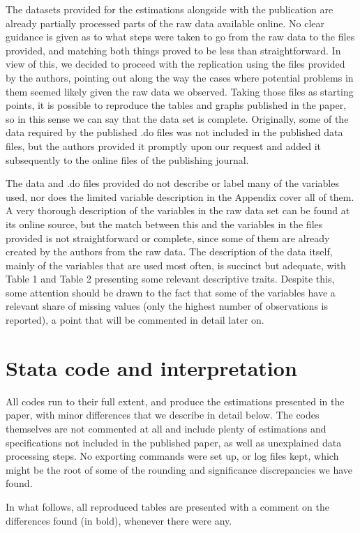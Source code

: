 \documentclass{article}
\begin{document}
The datasets provided for the estimations alongside with the publication are already partially processed parts of the raw data available online. No clear guidance is given as to what steps were taken to go from the raw data to the files provided, and matching both things proved to be less than straightforward. In view of this, we decided to proceed with the replication using the files provided by the authors, pointing out along the way the cases where potential problems in them seemed likely given the raw data we observed. Taking those files as starting points, it is possible to reproduce the tables and graphs published in the paper, so in this sense we can say that the data set is complete. Originally, some of the data required by the published .do files was not included in the published data files, but the authors provided it promptly upon our request and added it subsequently to the online files of the publishing journal.

The data and .do files provided do not describe or label many of the variables used, nor does the limited variable description in the Appendix cover all of them. A very thorough description of the variables in the raw data set can be found at its online source, but the match between this and the variables in the files provided is not straightforward or complete, since some of them are already created by the authors from the raw data. The description of the data itself, mainly of the variables that are used most often, is succinct but adequate, with Table 1 and Table 2 presenting some relevant descriptive traits. Despite this, some attention should be drawn to the fact that some of the variables have a relevant share of missing values (only the highest number of observations is reported), a point that will be commented in detail later on.

\section{Stata code and interpretation}
All codes run to their full extent, and produce the estimations presented in the paper, with minor differences that we describe in detail below. The codes themselves are not commented at all and include plenty of estimations and specifications not included in the published paper, as well as unexplained data processing steps. No exporting commands were set up, or log files kept, which might be the root of some of the rounding and significance discrepancies we have found. 

In what follows, all reproduced tables are presented with a comment on the differences found (in bold), whenever there were any.
\end{document}
